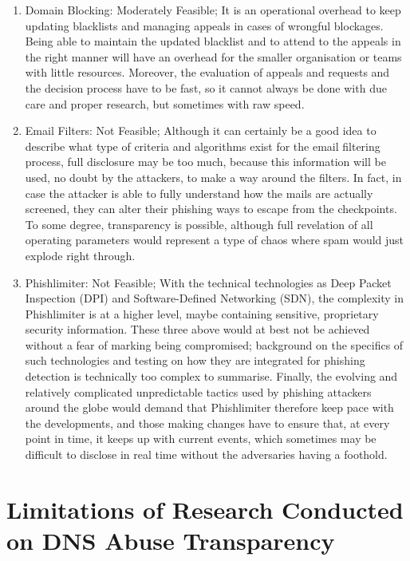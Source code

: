 \begin{enumerate}
     \item Domain Blocking: Moderately Feasible; It is an operational overhead to keep updating blacklists and managing appeals in cases of wrongful blockages. Being able to maintain the updated blacklist and to attend to the appeals in the right manner will have an overhead for the smaller organisation or teams with little resources. Moreover, the evaluation of appeals and requests and the decision process have to be fast, so it cannot always be done with due care and proper research, but sometimes with raw speed.
     
    \item Email Filters: Not Feasible;  Although it can certainly be a good idea to describe what type of criteria and algorithms exist for the email filtering process, full disclosure may be too much, because this information will be used, no doubt by the attackers, to make a way around the filters. In fact, in case the attacker is able to fully understand how the mails are actually screened, they can alter their phishing ways to escape from the checkpoints. To some degree, transparency is possible, although full revelation of all operating parameters would represent a type of chaos where spam would just explode right through.
    
   
    \item Phishlimiter: Not Feasible; With the technical technologies as Deep Packet Inspection (DPI) and Software-Defined Networking (SDN), the complexity in Phishlimiter is at a higher level, maybe containing sensitive, proprietary security information. These three above would at best not be achieved without a fear of marking being compromised; background on the specifics of such technologies and testing on how they are integrated for phishing detection is technically too complex to summarise. Finally, the evolving and relatively complicated unpredictable tactics used by phishing attackers around the globe would demand that Phishlimiter therefore keep pace with the developments, and those making changes have to ensure that, at every point in time, it keeps up with current events, which sometimes may be difficult to disclose in real time without the adversaries having a foothold.
    
\end{enumerate}

\section{Limitations of Research Conducted on DNS Abuse Transparency }

